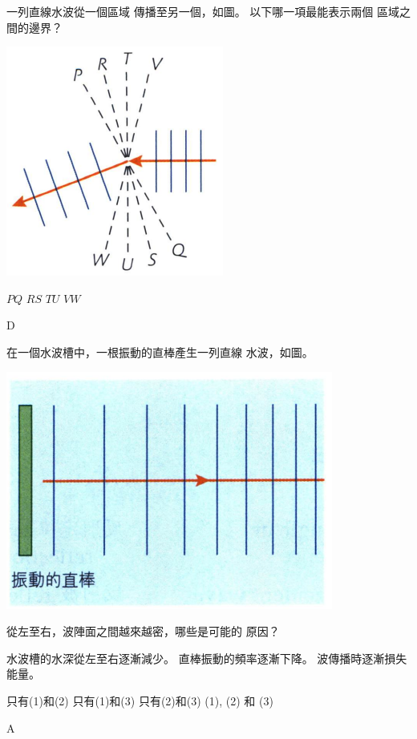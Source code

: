 {
    一列直線水波從一個區域 傳播至另一個，如圖。 以下哪一項最能表示兩個 區域之間的邊界？
    \par{\par\centering\includegraphics[width=.25\textwidth]{./img/ch2_earlyclass_wave_mc_2024-05-13-21-24-16.png}\par}
    \begin{tasks}
        \task $PQ$
        \task $RS$
        \task $TU$
        \task $VW$
    \end{tasks}
}{\mckey D}

{
    在一個水波槽中，一根振動的直棒產生一列直線 水波，如圖。
    \par{\par\centering\includegraphics[width=.35\textwidth]{./img/ch2_earlyclass_wave_mc_2024-05-13-21-26-07.png}\par}
    從左至右，波陣面之間越來越密，哪些是可能的 原因？
    \begin{statements}
        \task 水波槽的水深從左至右逐漸減少。
        \task 直棒振動的頻率逐漸下降。
        \task 波傳播時逐漸損失能量。
    \end{statements}
    \begin{tasks}
        \task 只有(1)和(2)
        \task 只有(1)和(3)
        \task 只有(2)和(3)
        \task (1), (2) 和 (3)
    \end{tasks}
}{\mckey A}

